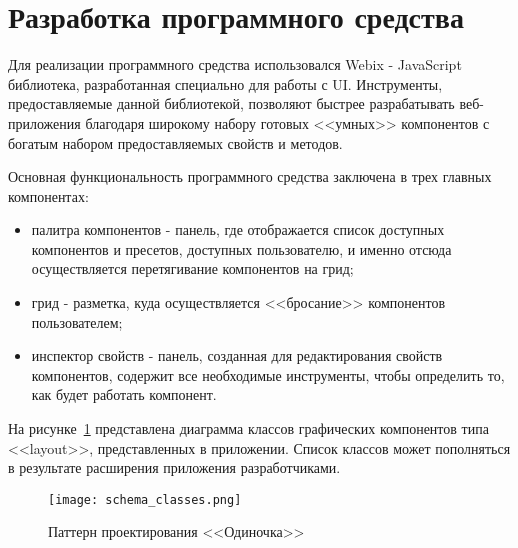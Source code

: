 \section{Разработка программного средства} 
\label{sec:development}

Для реализации программного средства использовался Webix - JavaScript библиотека, разработанная специально для работы с UI. Инструменты, предоставляемые данной библиотекой, позволяют быстрее разрабатывать веб-приложения благодаря широкому набору готовых <<умных>> компонентов с богатым набором предоставляемых свойств и методов.

Основная функциональность программного средства заключена в трех главных компонентах: 
\begin{itemize}
	\item палитра компонентов - панель, где отображается список доступных компонентов и пресетов, доступных пользователю, и именно отсюда осуществляется перетягивание компонентов на грид;
	\item грид - разметка, куда осуществляется <<бросание>> компонентов пользователем;
	\item инспектор свойств - панель, созданная для редактирования свойств компонентов, содержит все необходимые инструменты, чтобы определить то, как будет работать компонент.
\end{itemize}
  
На рисунке~\ref{sec:development:schema_classes} представлена диаграмма классов графических компонентов типа <<layout>>, представленных в приложении. Список классов может пополняться в результате расширения приложения разработчиками.\pagebreak

\begin{figure}[ht]
  \centering
    \texttt{[image: schema\_classes.png]}
    \caption{Паттерн проектирования <<Одиночка>>}
    \label{sec:development:schema_classes}
\end{figure}







